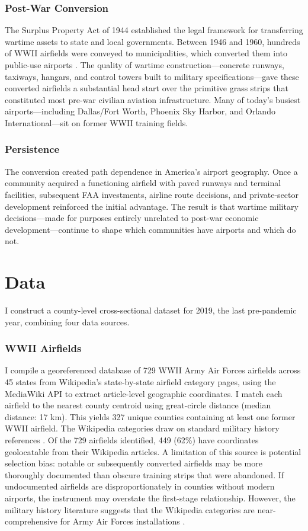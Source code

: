 \documentclass[12pt]{article}
\begin{document}
\subsubsection*{Post-War Conversion} The Surplus Property Act of 1944 established the legal framework for transferring wartime assets to state and local governments. Between 1946 and 1960, hundreds of WWII airfields were conveyed to municipalities, which converted them into public-use airports \citep{komons1978}. The quality of wartime construction---concrete runways, taxiways, hangars, and control towers built to military specifications---gave these converted airfields a substantial head start over the primitive grass strips that constituted most pre-war civilian aviation infrastructure. Many of today's busiest airports---including Dallas/Fort Worth, Phoenix Sky Harbor, and Orlando International---sit on former WWII training fields.

\subsubsection*{Persistence} The conversion created path dependence in America's airport geography. Once a community acquired a functioning airfield with paved runways and terminal facilities, subsequent FAA investments, airline route decisions, and private-sector development reinforced the initial advantage. The result is that wartime military decisions---made for purposes entirely unrelated to post-war economic development---continue to shape which communities have airports and which do not.

\section{Data}

I construct a county-level cross-sectional dataset for 2019, the last pre-pandemic year, combining four data sources.

\subsubsection*{WWII Airfields} I compile a georeferenced database of 729 WWII Army Air Forces airfields across 45 states from Wikipedia's state-by-state airfield category pages, using the MediaWiki API to extract article-level geographic coordinates. I match each airfield to the nearest county centroid using great-circle distance (median distance: 17 km). This yields 327 unique counties containing at least one former WWII airfield. The Wikipedia categories draw on standard military history references \citep{mueller1989, maurer1983}. Of the 729 airfields identified, 449 (62\%) have coordinates geolocatable from their Wikipedia articles. A limitation of this source is potential selection bias: notable or subsequently converted airfields may be more thoroughly documented than obscure training strips that were abandoned. If undocumented airfields are disproportionately in counties without modern airports, the instrument may overstate the first-stage relationship. However, the military history literature suggests that the Wikipedia categories are near-comprehensive for Army Air Forces installations \citep{maurer1983}.
\end{document}
